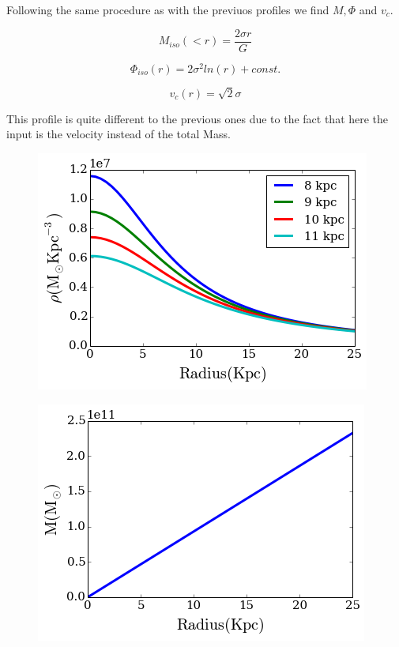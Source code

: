\documentclass[a4paper, 12pt]{article} %
\begin{document}
Following the same procedure as with the previuos profiles we find $M, \Phi$  and $v_c$.

\begin{equation}
M_{iso}(<r) = \dfrac{2 \sigma r}{G}
\end{equation}

\begin{equation}
\Phi_{iso}(r) = 2 \sigma^2 ln(r)  + const.
\end{equation}

\begin{equation}\label{eq:SISv}
v_c(r) = \sqrt{2}\sigma
\end{equation}

This profile is quite different to the previous ones due to the fact that here the input is
the velocity instead of the total Mass.

\begin{figure}[H]
\centering
\includegraphics[scale=0.7]{sis_density.png}
\end{figure} 

\begin{figure}[H]
\centering
\includegraphics[scale=0.7]{sis_mass.png}
\end{figure}
\end{document}
